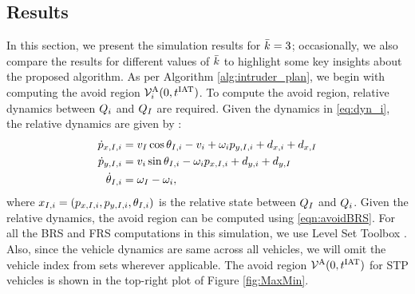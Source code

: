 \subsection{Results \label{sec:simResults}}
In this section, we present the simulation results for $\bar{k} = 3$; occasionally, we also compare the results for different values of $\bar{k}$ to highlight some key insights about the proposed algorithm. As per Algorithm \ref{alg:intruder_plan}, we begin with computing the avoid region $\mathcal{V}^{\text{A}}_{i}(0, t^\text{IAT})$. To compute the avoid region, relative dynamics between $Q_i$ and $Q_{I}$ are required. Given the dynamics in \eqref{eq:dyn_i}, the relative dynamics are given by \cite{Mitchell05}:
\begin{equation}
\label{eq:reldyn_i}
\begin{aligned}
\dot{\pos}_{x, \intr, i} &= v_{\intr} \cos \theta_{\intr, i} - v_i + \omega_i {\pos}_{y, \intr, i} + d_{x,i} + d_{x,\intr}\\
\dot{\pos}_{y, \intr, i} &= v_i \sin \theta_{\intr, i} - \omega_i {\pos}_{x, \intr, i} + d_{y,i} + d_{y,\intr}\\
\dot{\theta}_{\intr, i} &= \omega_{\intr} - \omega_i,
\end{aligned}
\end{equation}    
where $x_{I, i} = (p_{x, I, i}, p_{y, I, i}, \theta_{I, i})$ is the relative state between $Q_{I}$ and $Q_i$. Given the relative dynamics, the avoid region can be computed using \eqref{eqn:avoidBRS}. For all the BRS and FRS computations in this simulation, we use Level Set Toolbox \cite{Mitchell07b}. Also, since the vehicle dynamics are same across all vehicles, we will omit the vehicle index from sets wherever applicable. The avoid region $\mathcal{V}^{\text{A}}(0, t^\text{IAT})$ for STP vehicles is shown in the top-right plot of Figure \ref{fig:MaxMin}.

